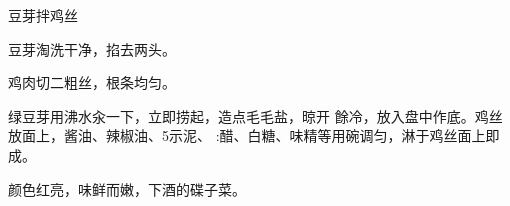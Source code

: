 \begin{recipe}[银芽拌鸡丝]{豆芽拌鸡丝}

\ingredients



\cooking

\step 	豆芽淘洗干净，掐去两头。

\step 	鸡肉切二粗丝，根条均匀。

\step 	绿豆芽用沸水汆一下，立即捞起，造点毛毛盐，晾开 餘冷，放入盘中作底。鸡丝放面上，酱油、辣椒油、5示泥、 :醋、白糖、味精等用碗调匀，淋于鸡丝面上即成。

\notes

颜色红亮，味鲜而嫩，下酒的碟子菜。

\end{recipe}

